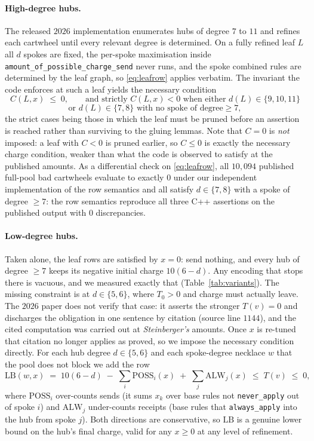 \documentclass[11pt]{article}
\theoremstyle{definition}
\newcommand{\LB}{\mathrm{LB}}
\begin{document}
\paragraph{High-degree hubs.} The released $2026$ implementation enumerates hubs
of degree $7$ to $11$ and refines each cartwheel until every relevant degree is
determined. On a fully refined leaf $L$ all $d$ spokes are fixed, the per-spoke
maximisation inside \texttt{amount\_of\_possible\_charge\_send} never runs, and
the spoke combined rules are determined by the leaf graph, so \eqref{eq:leafrow}
applies verbatim. The invariant the code enforces at such a leaf yields the
necessary condition
\[
  C(L,x) \;\le\; 0, \qquad\text{and strictly } C(L,x) < 0 \text{ when either }
  d(L) \in \{9,10,11\}
\]
\[
  \text{or } d(L)\in\{7,8\} \text{ with no spoke of degree} \ge 7 ,
\]
the strict cases being those in which the leaf must be pruned before an assertion
is reached rather than surviving to the gluing lemmas. Note that $C = 0$ is
\emph{not} imposed: a leaf with $C<0$ is pruned earlier, so $C \le 0$ is exactly
the necessary charge condition, weaker than what the code is observed to satisfy
at the published amounts. As a differential check on \eqref{eq:leafrow}, all
$10{,}094$ published full-pool bad cartwheels evaluate to exactly $0$ under our
independent implementation of the row semantics and all satisfy $d \in \{7,8\}$
with a spoke of degree $\ge 7$: the row semantics reproduce all three C++
assertions on the published output with $0$ discrepancies.

\paragraph{Low-degree hubs.} Taken alone, the leaf rows are satisfied by
$x = 0$: send nothing, and every hub of degree $\ge 7$ keeps its negative initial
charge $10(6-d)$. Any encoding that stops there is vacuous, and we measured
exactly that (Table~\ref{tab:variants}). The missing constraint is at
$d \in \{5,6\}$, where $T_0 > 0$ and charge must actually leave. The $2026$ paper
does not verify that case: it asserts the stronger $T(v) = 0$ and discharges the
obligation in one sentence by citation (source line $1144$), and the cited
computation \cite{steinberger2010} was carried out at \emph{Steinberger's}
amounts. Once $x$ is re-tuned that citation no longer applies as proved, so we
impose the necessary condition directly. For each hub degree $d\in\{5,6\}$ and
each spoke-degree necklace $w$ that the pool does not block we add the row
\begin{equation}
\label{eq:lowdeg}
  \LB(w,x) \;=\; 10(6-d) \;-\; \sum_i \mathrm{POSS}_i(x) \;+\; \sum_j \mathrm{ALW}_j(x)
  \;\le\; T(v) \;\le\; 0 ,
\end{equation}
where $\mathrm{POSS}_i$ over-counts sends (it sums $x_k$ over base rules not
\texttt{never\_apply} out of spoke $i$) and $\mathrm{ALW}_j$ under-counts receipts
(base rules that \texttt{always\_apply} into the hub from spoke $j$). Both
directions are conservative, so $\LB$ is a genuine lower bound on the hub's final
charge, valid for any $x \ge 0$ at any level of refinement.
\end{document}
